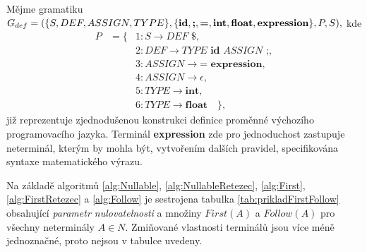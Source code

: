 \begin{priklad}
  Mějme gramatiku $G_{def} = (\{S, DEF, ASSIGN, TYPE\}, \{\textbf{id}, \textbf{;}, \textbf{=}, \textbf{int}, \textbf{float}, \\ \textbf{expression}\}, P, S),$ kde
  \begin{eqnarray*}
    P & = \{ & 1\!: S \rightarrow DEF \textbf{ \$}, \\
      &      & 2\!: DEF \rightarrow TYPE \textbf{ id } ASSIGN \textbf{ ;}, \\
      &      & 3\!: ASSIGN \rightarrow \textbf{= } \textbf{expression}, \\
      &      & 4\!: ASSIGN \rightarrow \epsilon, \\
      &      & 5\!: TYPE \rightarrow \textbf{int}, \\
      &      & 6\!: TYPE \rightarrow \textbf{float}\quad\},
  \end{eqnarray*}
  již reprezentuje zjednodušenou konstrukci definice proměnné výchozího programovacího jazyka. Terminál \textbf{expression} zde pro jednoduchost zastupuje neterminál, kterým by
  mohla být, vytvořením dalších pravidel, specifikována syntaxe matematického výrazu.

  Na základě algoritmů \ref{alg:Nullable}, \ref{alg:NullableRetezec}, \ref{alg:First}, \ref{alg:FirstRetezec} a \ref{alg:Follow} je sestrojena tabulka \ref{tab:prikladFirstFollow} obsahující
  \emph{parametr nulovatelnosti} a množiny $First(A)$ a $Follow(A)$ pro všechny neterminály $A \in N$. Zmiňované vlastnosti terminálů jsou více méně jednoznačné, proto nejsou v tabulce uvedeny.


\end{priklad}
